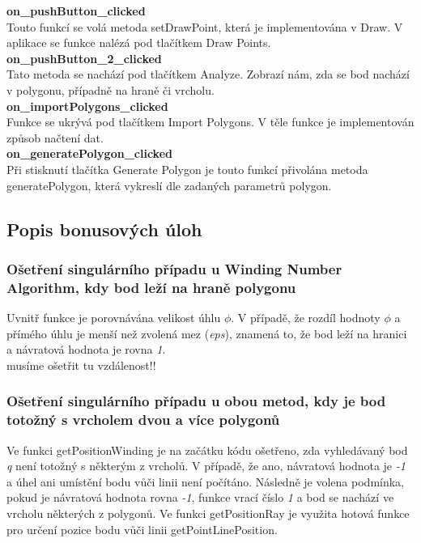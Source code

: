 \documentclass[a4paper, 12pt]{article}
\begin{document}
\textbf{on\_pushButton\_clicked}\\
Touto funkcí se volá metoda setDrawPoint, která je implementována v Draw. V aplikace se funkce nalézá pod tlačítkem Draw Points. \\

\textbf{on\_pushButton\_2\_clicked}\\
Tato metoda se nachází pod tlačítkem Analyze. Zobrazí nám, zda se bod nachází v polygonu, případně na hraně či vrcholu.\\

\textbf{on\_importPolygons\_clicked}\\
Funkce se ukrývá pod tlačítkem Import Polygons. V těle funkce je implementován způsob načtení dat.\\

\textbf{on\_generatePolygon\_clicked}\\
Při stisknutí tlačítka Generate Polygon je touto funkcí přivolána metoda generatePolygon, která vykreslí dle zadaných parametrů polygon.



\subsection{Popis bonusových úloh}
\subsubsection{Ošetření singulárního případu u Winding Number Algorithm, kdy bod leží na hraně polygonu}
Uvnitř funkce je porovnávána velikost úhlu $\phi$. V případě, že rozdíl hodnoty $\phi$ a přímého úhlu je menší než zvolená mez (\textit{eps}), znamená to, že bod leží na hranici a návratová hodnota je rovna  \textit{1}.
\\ musíme ošetřit tu vzdálenost!!

\subsubsection{Ošetření singulárního případu u obou metod, kdy je bod totožný s vrcholem dvou a více polygonů}
Ve funkci getPositionWinding je na začátku kódu ošetřeno, zda vyhledávaný bod \textit{q} není totožný s některým z vrcholů. V případě, že ano, návratová hodnota je \textit{-1} a úhel ani umístění bodu vůči linii není počítáno. Následně je volena podmínka, pokud je návratová hodnota rovna \textit{-1}, funkce vrací číslo \textit{1} a bod se nachází ve vrcholu některých z polygonů. Ve funkci getPositionRay je využita hotová funkce pro určení pozice bodu vůči linii getPointLinePosition.
\end{document}
